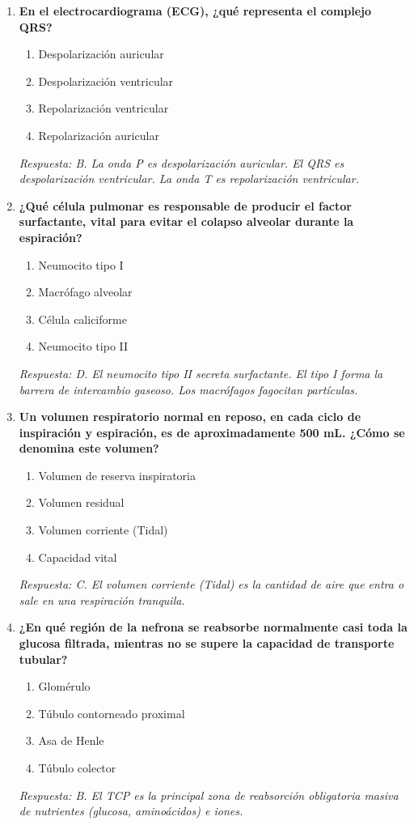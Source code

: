 \begin{enumerate}[label=\textbf{\arabic*.}]
    \item \textbf{En el electrocardiograma (ECG), ¿qué representa el complejo QRS?}
    \begin{enumerate}
        \item[A)] Despolarización auricular
        \item[B)] Despolarización ventricular
        \item[C)] Repolarización ventricular
        \item[D)] Repolarización auricular
    \end{enumerate}
    \textit{Respuesta: B. La onda P es despolarización auricular. El QRS es despolarización ventricular. La onda T es repolarización ventricular.}

    \item \textbf{¿Qué célula pulmonar es responsable de producir el factor surfactante, vital para evitar el colapso alveolar durante la espiración?}
    \begin{enumerate}
        \item[A)] Neumocito tipo I
        \item[B)] Macrófago alveolar
        \item[C)] Célula caliciforme
        \item[D)] Neumocito tipo II
    \end{enumerate}
    \textit{Respuesta: D. El neumocito tipo II secreta surfactante. El tipo I forma la barrera de intercambio gaseoso. Los macrófagos fagocitan partículas.}

    \item \textbf{Un volumen respiratorio normal en reposo, en cada ciclo de inspiración y espiración, es de aproximadamente 500 mL. ¿Cómo se denomina este volumen?}
    \begin{enumerate}
        \item[A)] Volumen de reserva inspiratoria
        \item[B)] Volumen residual
        \item[C)] Volumen corriente (Tidal)
        \item[D)] Capacidad vital
    \end{enumerate}
    \textit{Respuesta: C. El volumen corriente (Tidal) es la cantidad de aire que entra o sale en una respiración tranquila.}

    \item \textbf{¿En qué región de la nefrona se reabsorbe normalmente casi toda la glucosa filtrada, mientras no se supere la capacidad de transporte tubular?}
    \begin{enumerate}
        \item[A)] Glomérulo
        \item[B)] Túbulo contorneado proximal
        \item[C)] Asa de Henle
        \item[D)] Túbulo colector
    \end{enumerate}
    \textit{Respuesta: B. El TCP es la principal zona de reabsorción obligatoria masiva de nutrientes (glucosa, aminoácidos) e iones.}


\end{enumerate}
